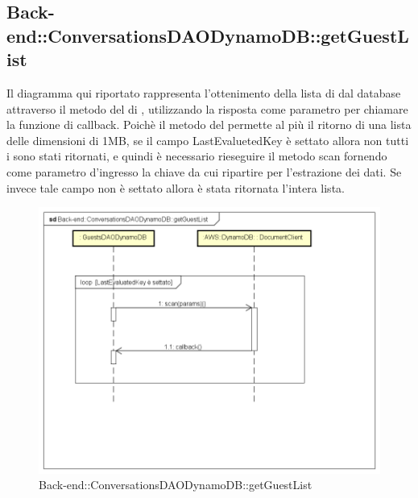\subsection{Back-end::ConversationsDAODynamoDB::getGuestList}
Il diagramma qui riportato rappresenta l'ottenimento della lista di  dal database attraverso il metodo  del  di , utilizzando la risposta come parametro per chiamare la funzione di callback. Poichè il metodo  del  permette al più il ritorno di una lista delle dimensioni di 1MB, se il campo LastEvaluetedKey è settato allora non tutti i  sono stati ritornati, e quindi è necessario rieseguire il metodo scan fornendo come parametro d'ingresso la chiave da cui ripartire per l'estrazione dei dati. Se invece tale campo non è settato allora è stata ritornata l'intera lista.
 \begin{figure}[h] \centering \includegraphics[width=\textwidth,height=\textheight,keepaspectratio]{images/diagrams/back-end/Ufficial_Backend/Back-endConversationsDAODynamoDBgetGuestList.png} 	\caption{Back-end::ConversationsDAODynamoDB::getGuestList}
\end{figure}

\newpage




